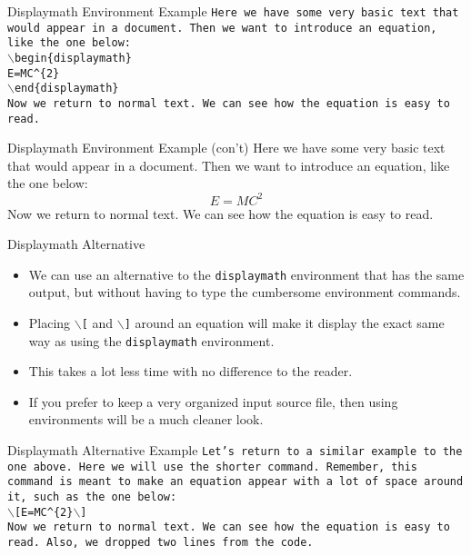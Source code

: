 \documentclass[pdf]{prosper}
\begin{document}
\begin{slide}{Displaymath Environment Example}
	\texttt{Here we have some very basic text that would appear in a document. Then we want to introduce an equation, like the one below:} \\
	\texttt{$\backslash$begin\{displaymath\}} \\
	\texttt{E=MC\^{}\{2\}} \\
	\texttt{$\backslash$end\{displaymath\}} \\
	\texttt{Now we return to normal text. We can see how the equation is easy to read.}
\end{slide}
\begin{slide}{Displaymath Environment Example (con't)}
	Here we have some very basic text that would appear in a document. Then we want to introduce an equation, like the one below:
	\begin{displaymath}
	E=MC^{2}
	\end{displaymath}
	Now we return to normal text. We can see how the equation is easy to read.
\end{slide}
\begin{slide}{Displaymath Alternative}
	\begin{itemize}
		\item We can use an alternative to the \texttt{displaymath} environment that has the same output, but without having to type the cumbersome environment commands.
		\item Placing \texttt{$\backslash$[} and \texttt{$\backslash$]} around an equation will make it display the exact same way as using the \texttt{displaymath} environment.
		\item This takes a lot less time with no difference to the reader.
		\item If you prefer to keep a very organized input source file, then using environments will be a much cleaner look.
	\end{itemize}
\end{slide}
\begin{slide}{Displaymath Alternative Example}
	\texttt{Let's return to a similar example to the one above. Here we will use the shorter command. Remember, this command is meant to make an equation appear with a lot of space around it, such as the one below:} \\
	\texttt{$\backslash$[E=MC\^{}\{2\}$\backslash$]} \\
	\texttt{Now we return to normal text. We can see how the equation is easy to read. Also, we dropped two lines from the code.}
\end{slide}
\end{document}
